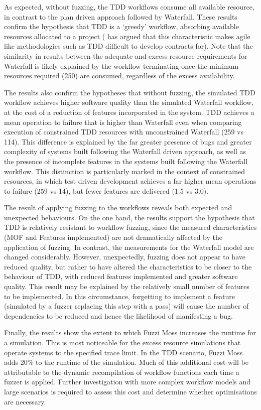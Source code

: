 \documentclass{sig-alternate}
\begin{document}
As expected, without fuzzing, the TDD workflows consume all available resource,
in contrast to the plan driven approach followed by Waterfall.  These results
confirm the hypothesis that TDD is a `greedy' workflow, absorbing available
resources allocated to a project (\citet{sommerville10software} has argued that
this characteristic makes agile like methodologies such as TDD difficult to
develop contracts for).  Note that the similarity in results between the
adequate and excess resource requirements for Waterfall is likely explained by
the workflow terminating once the minimum resources required (250) are consumed,
regardless of the excess availability.

The results also confirm the hypotheses that without fuzzing, the simulated TDD
workflow achieves higher software quality than the simulated Waterfall workflow,
at the cost of a reduction of features incorporated in the system.  TDD achieves
a mean operation to failure that is higher than Waterfall even when comparing
execution of constrained TDD resources with unconstrained Waterfall (259 vs
114).  This difference is explained by the far greater presence of bugs and
greater complexity of systems built following the Waterfall driven approach, as
well as the presence of incomplete features in the systems built following the
Waterfall workflow.  This distinction is particularly marked in the context of
constrained resources, in which test driven development achieves a far higher
mean operations to failure (259 vs 14), but fewer features are delivered (1.5 vs
3.0).

The result of applying fuzzing to the workflows reveals both expected and
unexpected behaviours.  On the one hand, the results support the hypothesis that
TDD is relatively resistant to workflow fuzzing, since the
measured characteristics (MOF and Features implemented) are not dramatically
affected by the application of fuzzing.  In contrast, the measurements for the
Waterfall model are changed considerably.  However, unexpectedly, fuzzing does
not appear to have reduced quality, but rather to have altered the
characteristics to be closer to the behaviour of TDD, with
reduced features implemented and greater software quality.  This result may be
explained by the relatively small number of features to be implemented.  In this
circumstance, forgetting to implement a feature (simulated by a fuzzer replacing
this step with a pass) will cause the number of dependencies to be reduced and
hence the likelihood of manifesting a bug.

Finally, the results show the extent to which Fuzzi Moss increases the runtime
for a simulation.  This is most noticeable for the excess resource simulations
that operate systems to the specified trace limit.  In the TDD scenario, Fuzzi
Moss adds 20\% to the runtime of the simulation.  Much of this additional cost
will be attributable to the dynamic recompilation of workflow functions each
time a fuzzer is applied.  Further investigation with more complex workflow
models and large scenarios is required to assess this cost and determine whether
optimisations are necessary.
\end{document}
